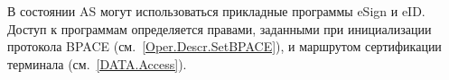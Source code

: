 В состоянии AS могут использоваться прикладные программы eSign и eID.
Доступ к программам определяется правами, 
заданными при инициализации протокола BPACE (см.~\ref{Oper.Descr.SetBPACE}), 
и маршрутом сертификации терминала (см.~\ref{DATA.Access}).


